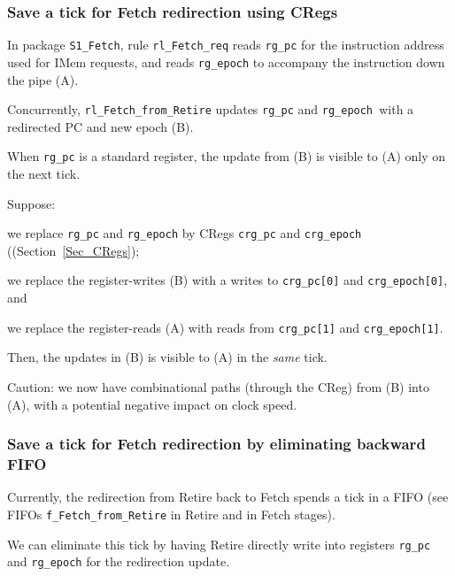 
\subsubsection{Save a tick for Fetch redirection using CRegs}

In package \verb|S1_Fetch|, rule \verb|rl_Fetch_req| reads
\verb|rg_pc| for the instruction address used for IMem requests, and
reads \verb|rg_epoch| to accompany the instruction down the pipe (A).

Concurrently, \verb|rl_Fetch_from_Retire| updates \verb|rg_pc| and
\verb|rg_epoch |with a redirected PC and new epoch (B).

When \verb|rg_pc| is a standard register, the update from (B) is
visible to (A) only on the next tick.

Suppose:
\begin{tightlist}

 \item we replace \verb|rg_pc| and \verb|rg_epoch| by CRegs \verb|crg_pc|
       and \verb|crg_epoch| ((Section~\ref{Sec_CRegs});

 \item we replace the register-writes (B) with a writes to \verb|crg_pc[0]|
       and \verb|crg_epoch[0]|, and

 \item we replace the register-reads (A) with reads from
       \verb|crg_pc[1]| and \verb|crg_epoch[1]|.

\end{tightlist}
Then, the updates in (B) is visible to (A) in the \emph{same} tick.

Caution: we now have combinational paths (through the CReg) from
(B) into (A), with a potential negative impact on clock speed.


\subsubsection{Save a tick for Fetch redirection by eliminating backward FIFO}

Currently, the redirection from Retire back to Fetch spends a tick in
a FIFO (see FIFOs \verb|f_Fetch_from_Retire| in Retire and in Fetch
stages).

We can eliminate this tick by having Retire directly write into
registers \verb|rg_pc| and \verb|rg_epoch| for the redirection update.

